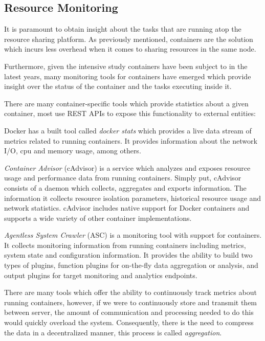 \subsection{Resource Monitoring}

It is paramount to obtain insight about the tasks that are running atop the resource sharing platform. As previously mentioned, containers are the solution which incurs less overhead when it comes to sharing resources in the same node. 

Furthermore, given the intensive study containers have been subject to in the latest years, many monitoring tools for containers have emerged which provide insight over the status of the container and the tasks executing inside it.

There are many container-specific tools which provide statistics about a given container, most use REST APIs to expose this functionality to external entities:

Docker \cite{docker} has a built tool called \textit{docker stats} \cite{docker_stats} which provides a live data stream of metrics related to running containers. It provides information about the network I/O, cpu and memory usage, among others. 

\textit{Container Advisor} \cite{cAdvisor} (cAdvisor) is a service which analyzes and exposes resource usage and performance data from running containers. Simply put, cAdvisor consists of a daemon which collects, aggregates and exports information. The information it collects resource isolation parameters, historical resource usage and network statistics. cAdvisor includes native support for Docker containers and supports a wide variety of other container implementations.

\textit{Agentless System Crawler}  (ASC) \cite{cloudviz_2019} is a monitoring tool with support for containers. It collects monitoring information from running containers including metrics, system state and configuration information. It provides the ability to build two types of plugins, function  plugins for on-the-fly data aggregation or analysis, and output plugins for target monitoring and analytics endpoints.

There are many tools which offer the ability to continuously track metrics about running containers, however, if we were to continuously store and transmit them between server, the amount of communication and processing needed to do this would quickly overload the system. Consequently, there is the need  to compress the data in a decentralized manner, this process is called \textit{aggregation}.

